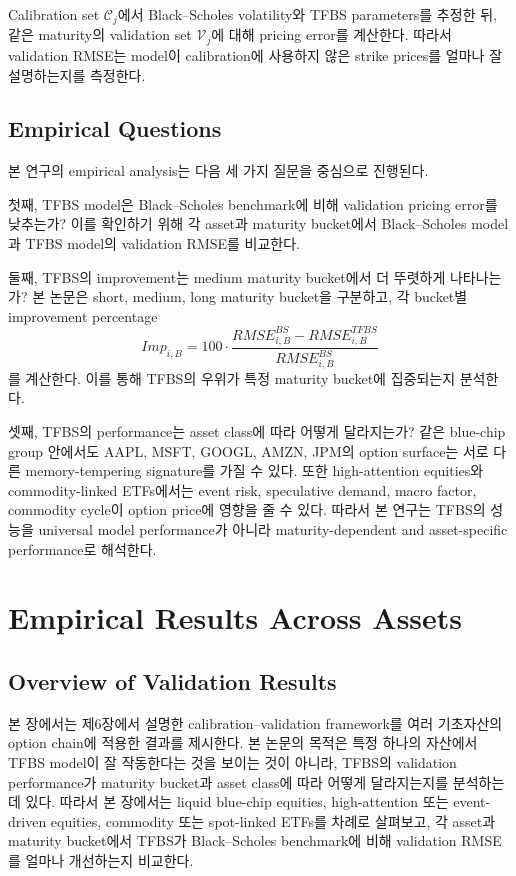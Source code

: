 \documentclass[11pt,a4paper]{report}
\begin{document}
Calibration set $\mathcal{C}_j$에서 Black--Scholes volatility와 TFBS parameters를 추정한 뒤, 같은 maturity의 validation set $\mathcal{V}_j$에 대해 pricing error를 계산한다. 따라서 validation RMSE는 model이 calibration에 사용하지 않은 strike prices를 얼마나 잘 설명하는지를 측정한다.

\section{Empirical Questions}

본 연구의 empirical analysis는 다음 세 가지 질문을 중심으로 진행된다.

첫째, TFBS model은 Black--Scholes benchmark에 비해 validation pricing error를 낮추는가? 이를 확인하기 위해 각 asset과 maturity bucket에서 Black--Scholes model과 TFBS model의 validation RMSE를 비교한다.

둘째, TFBS의 improvement는 medium maturity bucket에서 더 뚜렷하게 나타나는가? 본 논문은 short, medium, long maturity bucket을 구분하고, 각 bucket별 improvement percentage
\[
Imp_{i,B}
=
100
\cdot
\frac{
RMSE_{i,B}^{BS}
-
RMSE_{i,B}^{TFBS}
}{
RMSE_{i,B}^{BS}
}
\]
를 계산한다. 이를 통해 TFBS의 우위가 특정 maturity bucket에 집중되는지 분석한다.

셋째, TFBS의 performance는 asset class에 따라 어떻게 달라지는가? 같은 blue-chip group 안에서도 AAPL, MSFT, GOOGL, AMZN, JPM의 option surface는 서로 다른 memory-tempering signature를 가질 수 있다. 또한 high-attention equities와 commodity-linked ETFs에서는 event risk, speculative demand, macro factor, commodity cycle이 option price에 영향을 줄 수 있다. 따라서 본 연구는 TFBS의 성능을 universal model performance가 아니라 maturity-dependent and asset-specific performance로 해석한다.















\chapter{Empirical Results Across Assets}

\section{Overview of Validation Results}

본 장에서는 제6장에서 설명한 calibration--validation framework를 여러 기초자산의 option chain에 적용한 결과를 제시한다. 본 논문의 목적은 특정 하나의 자산에서 TFBS model이 잘 작동한다는 것을 보이는 것이 아니라, TFBS의 validation performance가 maturity bucket과 asset class에 따라 어떻게 달라지는지를 분석하는 데 있다. 따라서 본 장에서는 liquid blue-chip equities, high-attention 또는 event-driven equities, commodity 또는 spot-linked ETFs를 차례로 살펴보고, 각 asset과 maturity bucket에서 TFBS가 Black--Scholes benchmark에 비해 validation RMSE를 얼마나 개선하는지 비교한다.
\end{document}

